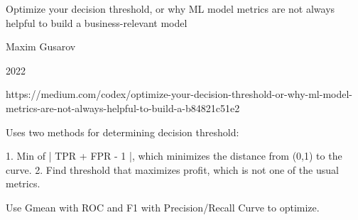 Optimize your decision threshold, or why ML model metrics are not always helpful to build a business-relevant model

Maxim Gusarov

2022

https://medium.com/codex/optimize-your-decision-threshold-or-why-ml-model-metrics-are-not-always-helpful-to-build-a-b84821c51e2

Uses two methods for determining decision threshold:

1.  Min of | TPR + FPR - 1 |, which minimizes the distance from (0,1) to the curve.  
2.  Find threshold that maximizes profit, which is not one of the usual metrics.  

Use Gmean with ROC and F1 with Precision/Recall Curve to optimize.  